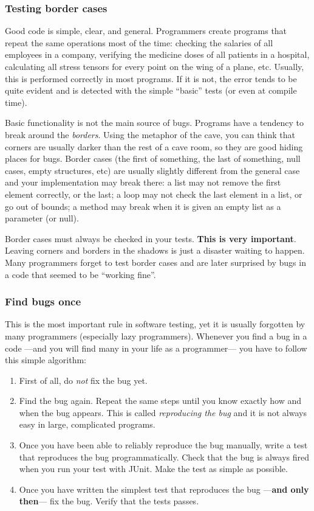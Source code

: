\subsubsection{Testing border cases}
\label{sec:testing-border-cases}

Good code is simple, clear, and general. Programmers create programs
that repeat the same operations most of the time: checking the
salaries of all employees in a company, verifying the medicine doses
of all patients in a hospital, calculating all stress tensors for
every point on the wing of a plane, etc. Usually, this is performed
correctly in most programs. If it is not, the error tends to be quite
evident and is detected with the simple
``basic'' tests (or even at compile time).

Basic functionality is not the main source of bugs. 
Programs have a tendency to break around the \emph{borders}. Using the
metaphor of the cave, you can think that corners are usually darker
than the rest of a cave room, so they are good hiding places for
bugs. Border cases (the first of something, the last of something, null
cases, empty structures, etc) are usually slightly
different from the general case and your implementation may break
there: a list may not remove the first element correctly, or the
last; a loop may not check the last element in a list, or go out of
bounds; a method may break when it is given an empty list as a
parameter (or null). 

Border cases must always be checked in your tests. \textbf{This is very
important}. Leaving corners and borders in the shadows is just a
disaster waiting to happen. Many programmers forget to test border
cases and are later surprised by bugs in a code that seemed to be
``working fine''.

\subsubsection{Find bugs once}
\label{sec:find-bugs-once}

This is the most important rule in software testing, yet it is usually
forgotten by many programmers (especially lazy programmers). Whenever
you find a bug in a code ---and you will find many in your life as a
programmer--- you have to follow this simple algorithm: 

\begin{enumerate}
\item First of all, do \emph{not} fix the bug yet. 
\item Find the bug again. Repeat the same steps until you know exactly
  how and when the bug appears. This is called
  \emph{reproducing the bug} and it is not always easy in large,
  complicated programs.
\item Once you have been able to reliably reproduce the bug manually,
  write a test that reproduces the bug programmatically. Check that
  the bug is always fired when you run your test with JUnit. Make the
  test as simple as possible.
\item Once you have written the simplest test that reproduces the bug
  ---\textbf{and only then}--- fix the bug. Verify that the tests passes. 
\end{enumerate}

